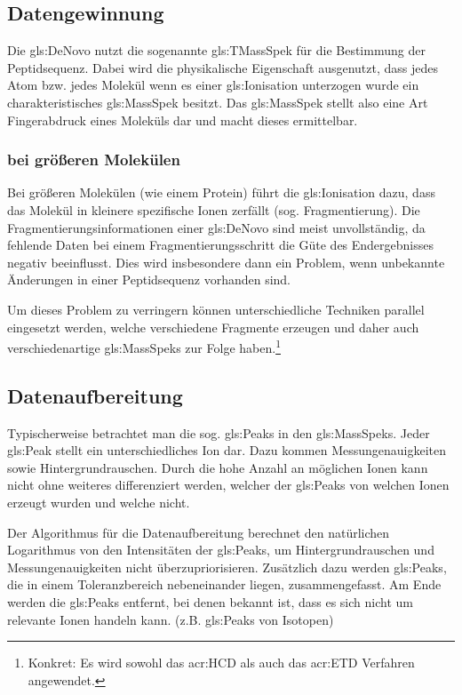 \documentclass[a4paper, 12pt]{article}
\newcommand{\gerquot}[1]{\glqq#1\grqq}
\newcommand{\dashAndSpace}{\textendash \space}
\begin{document}
\subsection{Datengewinnung}
Die \gls{gls:DeNovo} nutzt die sogenannte \gls{gls:TMassSpek} für die Bestimmung der Peptidsequenz. Dabei wird die physikalische Eigenschaft ausgenutzt, dass jedes Atom bzw. jedes Molekül \dashAndSpace wenn es einer \gls{gls:Ionisation} unterzogen wurde \dashAndSpace ein charakteristisches \gls{gls:MassSpek} besitzt. Das \gls{gls:MassSpek} stellt also eine Art \gerquot{Fingerabdruck} eines Moleküls dar und macht dieses ermittelbar.


\subsubsection{ bei größeren Molekülen}
Bei größeren Molekülen (wie einem Protein) führt die \gls{gls:Ionisation} dazu, dass das Molekül in kleinere spezifische Ionen zerfällt (sog. Fragmentierung). Die Fragmentierungsinformationen einer \gls{gls:DeNovo} sind meist unvollständig, da fehlende Daten bei einem Fragmentierungsschritt die Güte des Endergebnisses negativ beeinflusst. Dies wird insbesondere dann ein Problem, wenn unbekannte Änderungen in einer Peptidsequenz vorhanden sind.

Um dieses Problem zu verringern können unterschiedliche Techniken parallel eingesetzt werden, welche verschiedene Fragmente erzeugen und daher auch verschiedenartige \glspl{gls:MassSpek} zur Folge haben.\footnote{Konkret: Es wird sowohl das \gls{acr:HCD} als auch das \gls{acr:ETD} Verfahren angewendet.}

\subsection{Datenaufbereitung}
Typischerweise betrachtet man die sog. \gerquot{\glspl{gls:Peak}} in den \glspl{gls:MassSpek}. Jeder \gls{gls:Peak} stellt ein unterschiedliches Ion dar. Dazu kommen Messungenauigkeiten sowie Hintergrundrauschen. Durch die hohe Anzahl an möglichen Ionen kann nicht ohne weiteres differenziert werden, welcher der \glspl{gls:Peak} von welchen Ionen erzeugt wurden und welche nicht.

Der Algorithmus für die Datenaufbereitung berechnet den natürlichen Logarithmus von den Intensitäten der \glspl{gls:Peak}, um Hintergrundrauschen und Messungenauigkeiten nicht überzupriorisieren. Zusätzlich dazu werden \glspl{gls:Peak}, die in einem Toleranzbereich nebeneinander liegen, zusammengefasst. Am Ende werden die \glspl{gls:Peak} entfernt, bei denen bekannt ist, dass es sich nicht um relevante Ionen handeln kann. (z.B. \glspl{gls:Peak} von Isotopen)
\end{document}
